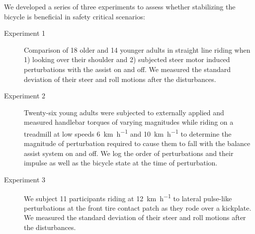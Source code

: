 \documentclass{icsc}
\def\kph{\kilo\meter\per\hour}
\begin{document}
We developed a series of three experiments to assess whether stabilizing the
bicycle is beneficial in safety critical scenarios:
\begin{description}
  \item[Experiment 1] Comparison of 18 older and 14 younger adults in straight
    line riding when 1) looking over their shoulder and 2) subjected steer
    motor induced perturbations with the assist on and off. We measured the
    standard deviation of their steer and roll motions after the disturbances.
  \item[Experiment 2] Twenty-six young adults were subjected to externally
    applied and measured handlebar torques of varying magnitudes while riding
    on a treadmill at low speeds 6~\si{\kph} and 10~\si{\kph} to determine the
    magnitude of perturbation required to cause them to fall with the balance
    assist system on and off. We log the order of perturbations and their
    impulse as well as the bicycle state at the time of perturbation.
  \item[Experiment 3] We subject 11 participants riding at 12~\si{\kph} to
    lateral pulse-like perturbations at the front tire contact patch as they
    rode over a kickplate. We measured the standard deviation of their steer
    and roll motions after the disturbances.
\end{description}
\end{document}
